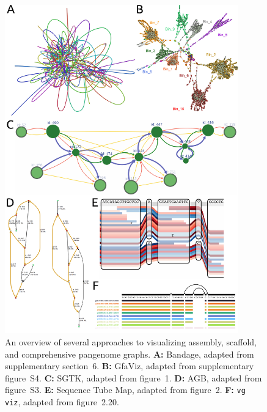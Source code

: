 \begin{figure}[h]
    \includegraphics[width=0.9\textwidth]{figures/visualization.pdf}
    \caption{\label{fig:visualization} An overview of several approaches to visualizing assembly, scaffold, and comprehensive pangenome graphs. \textbf{A:} Bandage, adapted from \cite{Wick_2015} supplementary section~6. \textbf{B:} GfaViz, adapted from \cite{Gonnella_2018} supplementary figure~S4. \textbf{C:} SGTK, adapted from \cite{Kunyavskaya_2018} figure~1. \textbf{D:} AGB, adapted from \cite{Mikheenko_2019} figure~S3. \textbf{E:} Sequence Tube Map, adapted from \cite{Beyer_2019} figure~2. \textbf{F:} \texttt{vg viz}, adapted from \cite{Garrison_2019} figure~2.20.}
\end{figure}

